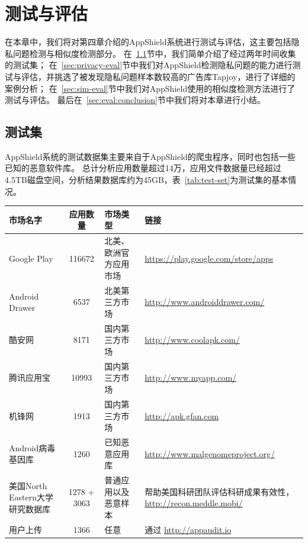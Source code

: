 \chapter{测试与评估}
\label{chap:evaluation}

在本章中，我们将对第四章介绍的AppShield系统进行测试与评估，这主要包括隐私问题检测与相似度检测部分。
在~\ref{sec:test-set}节中，我们简单介绍了经过两年时间收集的测试集；
在~\ref{sec:privacy-eval}节中我们对AppShield检测隐私问题的能力进行测试与评估，并挑选了被发现隐私问题样本数较高的广告库Tapjoy，进行了详细的案例分析；
在~\ref{sec:sim-eval}节中我们对AppShield使用的相似度检测方法进行了测试与评估。
最后在~\ref{sec:eval:conclusion}节中我们将对本章进行小结。

\section{测试集}
\label{sec:test-set}


AppShield系统的测试数据集主要来自于AppShield的爬虫程序，同时也包括一些已知的恶意软件库。
总计分析应用数量超过14万，应用文件数据量已经超过4.5TB磁盘空间，分析结果数据库约为45GB，表~\ref{tab:test-set}为测试集的基本情况。

\begin{table}
	\centering
	\begin{tabularx}{\textwidth}{|X|c|X|X|}
		\hline
		市场名字 & 应用数量 & 市场类型 & 链接\\
		\hline
		Google Play & 116672 & 北美、欧洲官方应用市场 & \url{https://play.google.com/store/apps}\\
		\hline
		Android Drawer & 6537 & 北美第三方市场 & \url{http://www.androiddrawer.com/}\\
		\hline
		酷安网 & 8171 & 国内第三方市场 & \url{http://www.coolapk.com/}\\
		\hline
		腾讯应用宝 & 10993 & 国内第三方市场 & \url{http://www.myapp.com/}\\
		\hline
		机锋网 & 1913 & 国内第三方市场 & \url{http://apk.gfan.com}\\
		\hline
		Android病毒基因库 & 1260 & 已知恶意应用库 & \url{http://www.malgenomeproject.org/}\\
		\hline
		美国North Eastern大学研究数据库 & 1278 + 3063 & 普通应用以及恶意样本 & 帮助美国科研团队评估科研成果有效性，\url{http://recon.meddle.mobi/}\\
		\hline
		用户上传 & 1366 & 任意 & 通过 \newline 
								\url{http://appaudit.io}\\
		\hline
	\end{tabularx}
\end{table}



